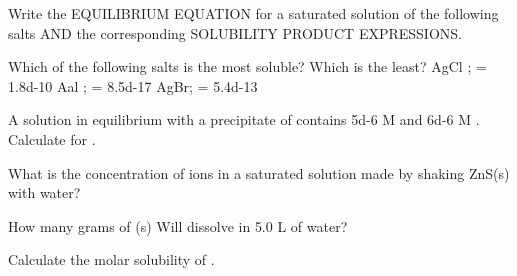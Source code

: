 \documentclass[fleqn]{exam}
\begin{document}
\begin{questions}
  \setcounter{question}{39}
  \question Write the EQUILIBRIUM EQUATION for a saturated solution of the following salts AND the corresponding SOLUBILITY PRODUCT EXPRESSIONS.

  \question Which of the following salts is the most soluble? Which is the least?
  \newline
  AgCl ;  = \num{1.8d-10} \newline
  Aal ;  = \num{8.5d-17} \newline
  AgBr;  = \num{5.4d-13}
  \vspace{1in}

  \question A solution in equilibrium with a precipitate of  contains \num{5d-6} M  and \num{6d-6} M . Calculate  for .
  \vspace{1in}

  \question What is the concentration of  ions in a saturated solution made by shaking ZnS(s) with water?
  \vspace{1in}

  \question How many grams of (s) Will dissolve in 5.0 L of water?
  \vspace{1in}

  \setcounter{question}{46}

  \question Calculate the molar solubility of .
  \vspace{1in}


\end{questions}
\end{document}
